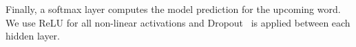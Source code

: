 Finally, a softmax layer computes the model prediction for the upcoming word. We use ReLU for all non-linear activations and Dropout~\cite{hinton2012dropout} is applied between each hidden layer.%








